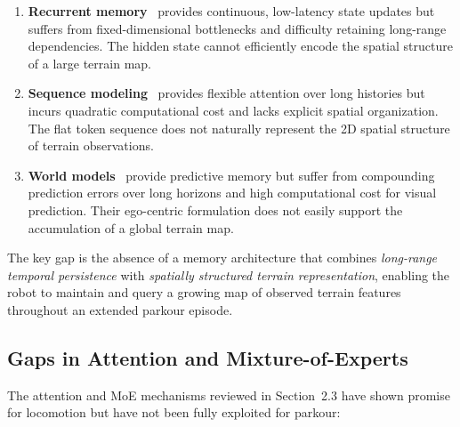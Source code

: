 \begin{enumerate}[leftmargin=2em]
\item \textbf{Recurrent memory}~\cite{zhang2024rpl,nahraendra2024dreamwaq} provides continuous, low-latency state updates but suffers from fixed-dimensional bottlenecks and difficulty retaining long-range dependencies. The hidden state cannot efficiently encode the spatial structure of a large terrain map.

\item \textbf{Sequence modeling}~\cite{radosavovic2024nexttoken,liu2024locoformer} provides flexible attention over long histories but incurs quadratic computational cost and lacks explicit spatial organization. The flat token sequence does not naturally represent the 2D spatial structure of terrain observations.

\item \textbf{World models}~\cite{liu2024egovision1,liu2024egovision2} provide predictive memory but suffer from compounding prediction errors over long horizons and high computational cost for visual prediction. Their ego-centric formulation does not easily support the accumulation of a global terrain map.
\end{enumerate}

The key gap is the absence of a memory architecture that combines \emph{long-range temporal persistence} with \emph{spatially structured terrain representation}, enabling the robot to maintain and query a growing map of observed terrain features throughout an extended parkour episode.

\subsection{Gaps in Attention and Mixture-of-Experts}

The attention and MoE mechanisms reviewed in Section~2.3 have shown promise for locomotion but have not been fully exploited for parkour:

